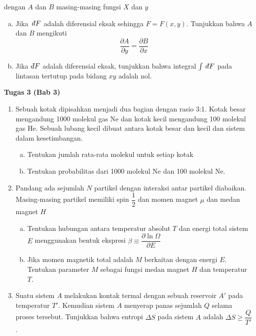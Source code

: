 \begin{enumerate}
        dengan $A$ dan $B$ masing-masing fungsi $X$ dan $y$
        \begin{enumerate}[(a)]
            \item Jika $\,d\hspace*{-0.08em}\bar{}\hspace*{0.1em} F$ adalah diferensial eksak sehingga $F=F(x,y)$. Tunjukkan bahwa $A$ dan $B$ mengikuti 
            \begin{equation*}
                \dfrac{\partial A}{\partial y}=\dfrac{\partial B}{\partial x}
            \end{equation*}
            \item Jika $d\hspace*{-0.08em}\bar{}\hspace*{0.1em} F$ adalah diferensial eksak, tunjukkan bahwa integral $\int \,d\hspace*{-0.08em}\bar{}\hspace*{0.1em} F$ pada lintasan tertutup pada bidang $xy$ adalah nol.
        \end{enumerate}
    \end{enumerate}
\textbf{Tugas 3 (Bab 3)}
\begin{enumerate}
    \item Sebuah kotak dipisahkan menjadi dua bagian dengan rasio 3:1. Kotak besar mengandung 1000
    molekul gas Ne dan kotak kecil mengandung 100 molekul gas He. Sebuah lubang kecil
    dibuat antara kotak besar dan kecil dan sistem dalam kesetimbangan.
    \begin{enumerate}[(a)]
        \item Tentukan jumlah rata-rata molekul untuk setiap kotak
        \item Tentukan probabilitas dari 1000 molekul Ne dan 100 molekul Ne.
    \end{enumerate}
    \item Pandang ada sejumlah $N$ partikel dengan interaksi antar partikel diabaikan. Masing-masing partikel memiliki spin $\dfrac{1}{2}$ dan momen magnet $\mu$ dan medan magnet $H$
    \begin{enumerate}[(a)]
        \item Tentukan hubungan antara temperatur absolut $T$ dan energi total sistem $E$ menggunakan bentuk ekspresi $\beta\equiv\dfrac{\partial\ln\Omega}{\partial E}$
        \item Jika momen magnetik total adalah $M$ berkaitan dengan energi $E$. Tentukan parameter $M$ sebagai fungsi medan magnet $H$ dan temperatur $T$.
    \end{enumerate}
    \item Suatu sistem $A$ melakukan kontak termal dengan sebuah reservoir $A'$ pada temperatur $T'$. Kemudian sistem $A$ menyerap panas sejumlah $Q$ selama proses tersebut. Tunjukkan bahwa entropi $\Delta S$ pada sistem $A$ adalah $\Delta S\ge \dfrac{Q}{T'}$.
\end{enumerate}
